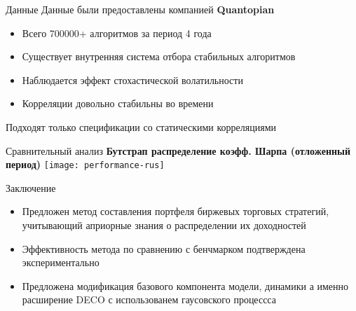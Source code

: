 \documentclass[12pt]{beamer}
\begin{document}
\begin{frame}{Данные}
Данные были предоставлены компанией \textbf{Quantopian}
\begin{itemize}
	\item Всего 700000+ алгоритмов за период 4 года
	\item Существует внутренняя система отбора стабильных алгоритмов
	\item Наблюдается эффект стохастической волатильности
	\item Корреляции довольно стабильны во времени
\end{itemize}
Подходят только спецификации со статическими корреляциями
\end{frame}

\begin{frame}{Сравнительный анализ}
\textbf{Бутстрап распределение коэфф. Шарпа (отложенный период)}
\texttt{[image: performance-rus]}
\end{frame}
\begin{frame}{Заключение}
\begin{itemize}
	\item Предложен метод составления портфеля биржевых торговых
стратегий, учитывающий априорные знания о распределении их доходностей
	\item Эффективность метода по сравнению с бенчмарком подтверждена экспериментально
	\item Предложена модификация базового компонента модели, динамики а именно расширение DECO с использованем гаусовского процессса
\end{itemize}
\end{frame}
\end{document}
